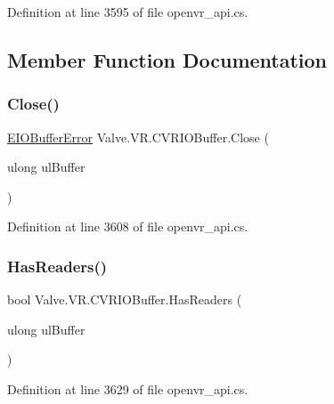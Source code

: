 Definition at line 3595 of file openvr\+\_\+api.\+cs.



\subsection{Member Function Documentation}
\mbox{\label{class_valve_1_1_v_r_1_1_c_v_r_i_o_buffer_a1bb10ae0041902776ce2cc7399b5a554}} 
\subsubsection{\texorpdfstring{Close()}{Close()}}
{\footnotesize\ttfamily \mbox{\hyperlink{namespace_valve_1_1_v_r_a11d6c73dbb80923b10779c007bb8c154}{E\+I\+O\+Buffer\+Error}} Valve.\+V\+R.\+C\+V\+R\+I\+O\+Buffer.\+Close (\begin{DoxyParamCaption}\item[{ulong}]{ul\+Buffer }\end{DoxyParamCaption})}



Definition at line 3608 of file openvr\+\_\+api.\+cs.

\mbox{\label{class_valve_1_1_v_r_1_1_c_v_r_i_o_buffer_ae405356ee953b590aae67ed096add888}} 
\subsubsection{\texorpdfstring{HasReaders()}{HasReaders()}}
{\footnotesize\ttfamily bool Valve.\+V\+R.\+C\+V\+R\+I\+O\+Buffer.\+Has\+Readers (\begin{DoxyParamCaption}\item[{ulong}]{ul\+Buffer }\end{DoxyParamCaption})}



Definition at line 3629 of file openvr\+\_\+api.\+cs.

\mbox{\label{class_valve_1_1_v_r_1_1_c_v_r_i_o_buffer_a1a33f5cfebb49a7c2d2c13bbaccd1f3c}} 
